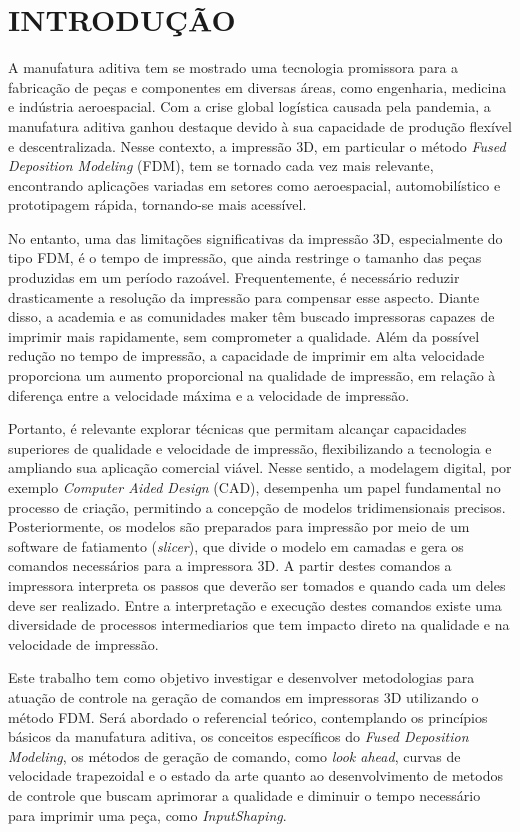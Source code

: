 \chapter{INTRODUÇÃO}
A manufatura aditiva tem se mostrado uma tecnologia promissora para a fabricação de peças e componentes em diversas áreas, como engenharia, medicina e indústria aeroespacial. Com a crise global logística causada pela pandemia, a manufatura aditiva ganhou destaque devido à sua capacidade de produção flexível e descentralizada. Nesse contexto, a impressão 3D, em particular o método \textit{Fused Deposition Modeling} (FDM), tem se tornado cada vez mais relevante, encontrando aplicações variadas em setores como aeroespacial, automobilístico e prototipagem rápida, tornando-se mais acessível.

No entanto, uma das limitações significativas da impressão 3D, especialmente do tipo FDM, é o tempo de impressão, que ainda restringe o tamanho das peças produzidas em um período razoável. Frequentemente, é necessário reduzir drasticamente a resolução da impressão para compensar esse aspecto. Diante disso, a academia e as comunidades maker têm buscado impressoras capazes de imprimir mais rapidamente, sem comprometer a qualidade. Além da possível redução no tempo de impressão, a capacidade de imprimir em alta velocidade proporciona um aumento proporcional na qualidade de impressão, em relação à diferença entre a velocidade máxima e a velocidade de impressão.

Portanto, é relevante explorar técnicas que permitam alcançar capacidades superiores de qualidade e velocidade de impressão, flexibilizando a tecnologia e ampliando sua aplicação comercial viável. Nesse sentido, a modelagem digital, por exemplo \textit{Computer Aided Design} (CAD), desempenha um papel fundamental no processo de criação, permitindo a concepção de modelos tridimensionais precisos. Posteriormente, os modelos são preparados para impressão por meio de um software de fatiamento (\textit{slicer}), que divide o modelo em camadas e gera os comandos necessários para a impressora 3D. A partir destes comandos a impressora interpreta os passos que deverão ser tomados e quando cada um deles deve ser realizado. Entre a interpretação e execução destes comandos existe uma diversidade de processos intermediarios que tem impacto direto na qualidade e na velocidade de impressão.

Este trabalho tem como objetivo investigar e desenvolver metodologias para atuação de controle na geração de comandos em impressoras 3D utilizando o método FDM. Será abordado o referencial teórico, contemplando os princípios básicos da manufatura aditiva, os conceitos específicos do \textit{Fused Deposition Modeling}, os métodos de geração de comando, como \textit{look ahead}, curvas de velocidade trapezoidal e o estado da arte quanto ao desenvolvimento de metodos de controle que buscam aprimorar a qualidade e diminuir o tempo necessário para imprimir uma peça, como \textit{InputShaping}.

